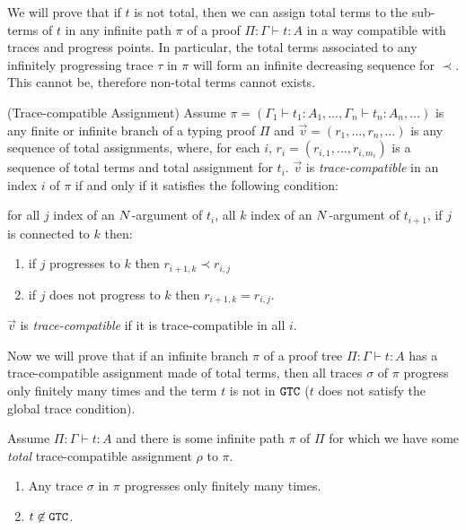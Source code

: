 We will prove that if $t$ is not total, then we can assign total terms to  the 
sub-terms of $t$ in any infinite path $\pi$ of a proof $\Pi : \Gamma \vdash t: A$ 
in a way compatible with traces and progress points. In particular, the 
total terms associated to any infinitely progressing trace $\tau$
in $\pi$ will form an infinite decreasing sequence for $\prec$.
This cannot be, therefore non-total terms cannot exists. 


\begin{definition}(Trace-compatible Assignment)
\label{definition-trace-compatible}
Assume $\pi  = (\Gamma_1 \vdash t_1:A_1, \ldots, \Gamma_n \vdash t_n:A_n, \ldots)$ 
is any finite or infinite branch of a typing proof $\Pi$
and $\vec{v} = (r_1, \ldots, r_n, \ldots)$ 
is any sequence of total assignments, where, for each $i$, $r_i=(r_{i,1},\ldots,r_{i,m_i})$ is a sequence of total terms and total assignment for $t_i$. 
$\vec{v}$ is \emph{trace-compatible} in an index $i$ of $\pi$  
if and only if it satisfies the following condition:

  for all $j$  index of an ${N}$-argument of $t_i$, 
  all $k$ index of an ${N}$-argument of $t_{i+1}$, 
  if $j$ is connected to $k$ then:
 \begin{enumerate}
 \item
 if $j$ progresses to $k$ then $r_{i+1,k} \prec r_{i,j}$ 
 \item
 if $j$ does not progress to $k$ then $r_{i+1,k} = r_{i,j}$.
 \end{enumerate}
$\vec{v}$ is \emph{trace-compatible} if it is trace-compatible in all $i$.
\end{definition}

Now we will prove that if an infinite branch $\pi$ of a proof tree $\Pi:\Gamma \vdash t:A$ 
has a trace-compatible assignment made of total terms, 
then all traces $\sigma$ of $\pi$ progress only finitely many times and the term $t$ is not in ${\tt GTC}$
($t$ does not satisfy the global trace condition).



\begin{proposition}
\label{prop:trace_assign-finiteness}
Assume $\Pi:\Gamma \vdash t:A$ and there is some infinite path $\pi$ of $\Pi$ for which we have
some \emph{total} trace-compatible assignment  $\rho$ to $\pi$. 
\begin{enumerate}
\item
\label{prop:trace_assign-finiteness1}
Any trace $\sigma$ in $\pi$ progresses only finitely many times.
\item
\label{prop:trace_assign-finiteness2}
$t \not \in {\tt GTC}$.
\end{enumerate}
\end{proposition}


